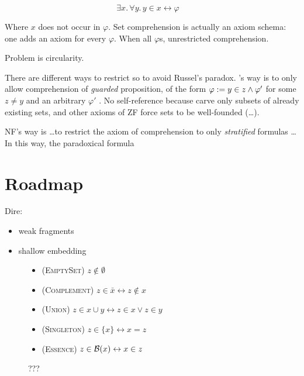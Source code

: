 \documentclass[sigplan,10pt,anonymous,review]{acmart}\settopmatter{printfolios=true,printccs=false,printacmref=false}
\begin{document}
\[ \exists x.\, \forall y.\, y \in x \leftrightarrow \varphi  \quad \tag{\SetCompr} \]

Where $x$ does not occur in $\varphi$.
Set comprehension is actually an axiom schema: one adds an axiom for every $\varphi$. 
When all $\varphi$s, unrestricted comprehension. 

Problem is circularity.

There are different ways to restrict \SetCompr{} so to avoid Russel's paradox. \ZF's way is to only allow comprehension of \emph{guarded} proposition, of the form $\varphi := y \in z \land \varphi'$ for some $z\neq y$ and an arbitrary $\varphi'$ . No self-reference because carve only subsets of already existing sets, and other axioms of ZF force sets to be well-founded (\dots).

NF's way is \dots to restrict the axiom of comprehension to only \emph{stratified} formulas \ldots In this way, the paradoxical formula 

\section{Roadmap}
Dire:
\begin{itemize}
  \item 
  weak fragments
  \item shallow embedding
\end{itemize}

\begin{figure}
  \begin{itemize}
    \item \textsc{(EmptySet)} $z \not\in \emptyset $
    \item \textsc{(Complement)} $z \in \bar x \leftrightarrow z \not\in x$
    \item \textsc{(Union)} $z \in x \cup y \leftrightarrow z \in x \lor z \in y$
    \item \textsc{(Singleton)} $z \in \{x\} \leftrightarrow x = z$
    \item \textsc{(Essence)} $z \in \mathcal{B}(x) \leftrightarrow x \in z$
  \end{itemize}
  \caption{???}
\end{figure}

\section{\NFTWO}
\section{\NFO}
\end{document}
